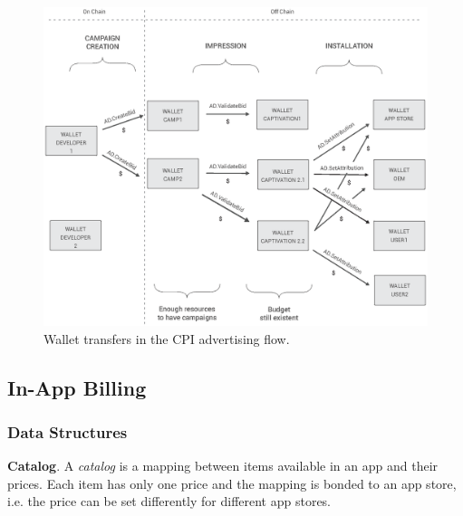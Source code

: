 \begin{figure}[!ht]
\centering
\includegraphics[width=\textwidth]{diagrams/wallet_transfers.eps}
\caption{Wallet transfers in the CPI advertising flow.}
\label{fig:wallet_cpi_flow}
\end{figure}


\subsection{In-App Billing}

\subsubsection{Data Structures}

\noindent \textbf{Catalog}. A \textit{catalog} is a mapping between items available in an app and their prices. Each item has only one price and the mapping is bonded to an app store, i.e. the price can be set differently for different app stores. \\

